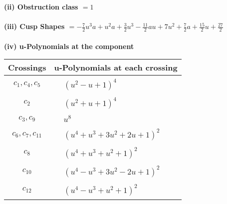 \documentclass[1p]{elsarticle_modified}
\theoremstyle{definition}
\begin{document}
\flushleft \textbf{(ii) Obstruction class $= 1$}\\~\\
\flushleft \textbf{(iii) Cusp Shapes $= -\frac{7}{2} u^3 a+u^2 a+\frac{3}{2} u^3-\frac{11}{2} a u+7 u^2+\frac{7}{2} a+\frac{15}{2} u+\frac{27}{2}$}\\~\\
\newpage\renewcommand{\arraystretch}{1}
\flushleft \textbf{(iv) u-Polynomials at the component}\newline \\
\begin{tabular}{m{50pt}|m{274pt}}
Crossings & \hspace{64pt}u-Polynomials at each crossing \\
\hline $$\begin{aligned}c_{1},c_{4},c_{5}\end{aligned}$$&$\begin{aligned}
&(u^2- u+1)^4
\end{aligned}$\\
\hline $$\begin{aligned}c_{2}\end{aligned}$$&$\begin{aligned}
&(u^2+u+1)^4
\end{aligned}$\\
\hline $$\begin{aligned}c_{3},c_{9}\end{aligned}$$&$\begin{aligned}
&u^8
\end{aligned}$\\
\hline $$\begin{aligned}c_{6},c_{7},c_{11}\end{aligned}$$&$\begin{aligned}
&(u^4+u^3+3 u^2+2 u+1)^2
\end{aligned}$\\
\hline $$\begin{aligned}c_{8}\end{aligned}$$&$\begin{aligned}
&(u^4+u^3+u^2+1)^2
\end{aligned}$\\
\hline $$\begin{aligned}c_{10}\end{aligned}$$&$\begin{aligned}
&(u^4- u^3+3 u^2-2 u+1)^2
\end{aligned}$\\
\hline $$\begin{aligned}c_{12}\end{aligned}$$&$\begin{aligned}
&(u^4- u^3+u^2+1)^2
\end{aligned}$\\
\hline
\end{tabular}\\~\\
\end{document}
